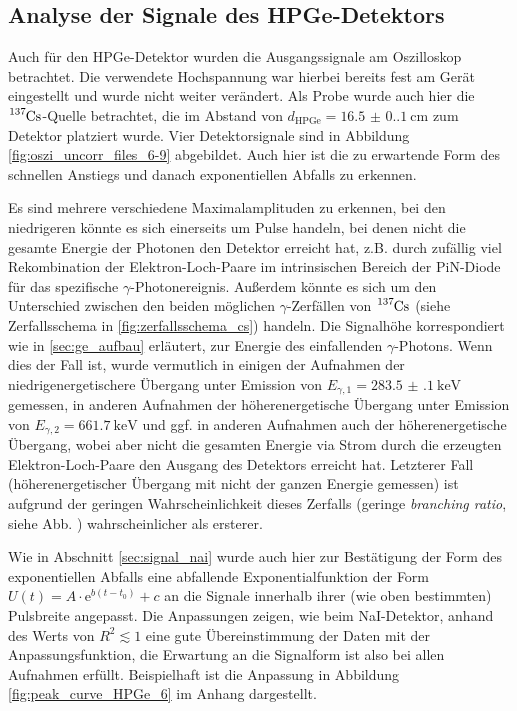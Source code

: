 \subsection{Analyse der Signale des HPGe-Detektors} \label{sec:signal_ge}

Auch für den HPGe-Detektor wurden die Ausgangssignale am Oszilloskop betrachtet. Die verwendete Hochspannung war hierbei bereits fest am Gerät eingestellt \cite[4]{521versuchsanleitung} und wurde nicht weiter verändert. Als Probe wurde auch hier die $\ce{ ^137Cs }$-Quelle betrachtet, die im Abstand von $d_\text{HPGe}=\SI{16.5(0.1)}{\centi\meter}$ zum Detektor platziert wurde.
Vier Detektorsignale sind in Abbildung \ref{fig:oszi_uncorr_files_6-9} abgebildet. Auch hier ist die zu erwartende Form des schnellen Anstiegs und danach exponentiellen Abfalls zu erkennen.


Es sind mehrere verschiedene Maximalamplituden zu erkennen, bei den niedrigeren könnte es sich einerseits um Pulse handeln, bei denen nicht die gesamte Energie der Photonen den Detektor erreicht hat, z.B. durch zufällig viel Rekombination der Elektron-Loch-Paare im intrinsischen Bereich der PiN-Diode für das spezifische $\gamma$-Photonereignis.
 Außerdem könnte es sich um den Unterschied zwischen den beiden möglichen $\gamma$-Zerfällen von $\ce{ ^137Cs }$ (siehe Zerfallsschema in \ref{fig:zerfallsschema_cs}) handeln. Die Signalhöhe korrespondiert wie in \ref{sec:ge_aufbau} erläutert, zur Energie des einfallenden $\gamma$-Photons. Wenn dies der Fall ist, wurde vermutlich in einigen der Aufnahmen
der niedrigenergetischere Übergang unter Emission von $E_{\gamma,1} = \SI{283.5(1)}{\kilo\eV}$ gemessen, in
anderen Aufnahmen
der höherenergetische Übergang unter Emission von $E_{\gamma,2} = \SI{661.7}{\kilo\eV}$ und ggf. in anderen Aufnahmen auch der höherenergetische Übergang, wobei aber nicht die gesamten Energie via Strom durch die erzeugten Elektron-Loch-Paare den Ausgang des Detektors erreicht hat. Letzterer Fall (höherenergetischer Übergang mit nicht der ganzen Energie gemessen) ist aufgrund der geringen Wahrscheinlichkeit dieses Zerfalls (geringe \textit{branching ratio}, siehe Abb. \cite{fig:zerfallsschema_cs}) wahrscheinlicher als ersterer.

Wie in Abschnitt \ref{sec:signal_nai} wurde auch hier zur Bestätigung der Form des exponentiellen Abfalls eine abfallende Exponentialfunktion der Form $U(t)=A\cdot \text{e}^{b(t-t_0)}+c$ an die Signale innerhalb ihrer (wie oben bestimmten) Pulsbreite angepasst. Die Anpassungen zeigen, wie beim NaI-Detektor, anhand des Werts von $R^2 \lesssim 1$ eine gute Übereinstimmung der Daten mit der Anpassungsfunktion, die Erwartung an die Signalform ist also bei allen Aufnahmen erfüllt. Beispielhaft ist die Anpassung in Abbildung \ref{fig:peak_curve_HPGe_6} im Anhang dargestellt.

